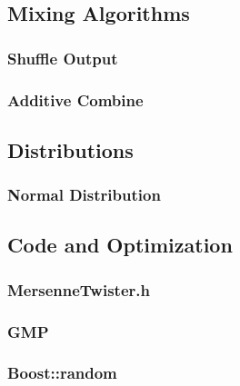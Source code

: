 \documentclass{scrartcl}
\begin{document}
\subsection{Mixing Algorithms}
\subsubsection{Shuffle Output}
\subsubsection{Additive Combine}
\subsection{Distributions}
\subsubsection{Normal Distribution}
\subsection{Code and Optimization}
\subsubsection{MersenneTwister.h}
\subsubsection{GMP}
\subsubsection{Boost::random}
\end{document}
